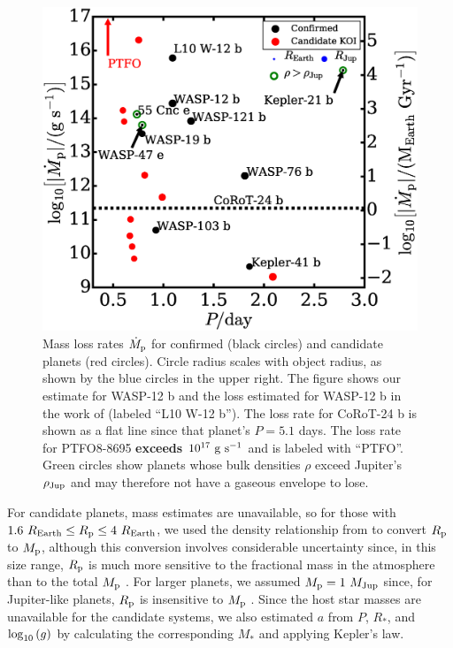 \documentclass{aastex}
\begin{document}
\begin{figure}
\includegraphics[width=\textwidth]{Mdots_real}
\caption{Mass loss rates $\dot{M}_{\rm p}$ for confirmed (black circles) and candidate planets (red circles). Circle radius scales with object radius, as shown by the blue circles in the upper right. The figure shows our estimate for WASP-12 b and the loss estimated for WASP-12 b in the work of \citet{2010Natur.463.1054L} (labeled ``L10 W-12 b''). The loss rate for CoRoT-24 b is shown as a flat line since that planet's $P = 5.1$ days. The loss rate for PTFO8-8695 {\bf exceeds $10^{17}\ {\rm g\ s^{-1}} $} and is labeled with ``PTFO''. Green circles show planets whose bulk densities $\rho$ exceed Jupiter's $\rho_{\rm Jup}$ and may therefore not have a gaseous envelope to lose.}
\label{fig:Mdots_real}
\end{figure}

For candidate planets, mass estimates are unavailable, so for those with $1.6\ R_{\rm Earth} \le R_{\rm p} \le 4\ R_{\rm Earth}$, we used the density relationship from \citet{2014ApJ...783L...6W} to convert $R_{\rm p}$ to $M_{\rm p}$, although this conversion involves considerable uncertainty since, in this size range, $R_{\rm p}$ is much more sensitive to the fractional mass in the atmosphere than to the total $M_{\rm p}$ \citep{2014ApJ...792....1L}. For larger planets, we assumed $M_{\rm p} = 1\ M_{\rm Jup}$ since, for Jupiter-like planets, $R_{\rm p}$ is insensitive to $M_{\rm p}$ \citep{1984plin.book.....H}. Since the host star masses are unavailable for the candidate systems, we also estimated $a$ from $P$, $R_*$, and $\log_{\rm 10}\left( g \right)$ by calculating the corresponding $M_*$ and applying Kepler's law. 
\end{document}
